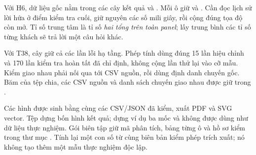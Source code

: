 Với H6, dữ liệu gốc nằm trong các cây kết quả
 và . Mỗi ô giữ
 và . Cần đọc lịch sử lời hứa
ở điểm kiểm tra cuối, giữ nguyên các số mili giây, rồi cộng đúng tọa độ
còn mở. Tỉ số trung tâm là tỉ số \emph{hai tổng trên toàn panel}; lấy trung
bình các tỉ số từng khách sẽ trả lời một câu hỏi khác.

Với T38, cây  giữ cả các lần lỗi hạ tầng. Phép
tính dùng đúng 15 lần hiệu chỉnh và 170 lần kiểm tra hoàn tất đã chỉ định,
không cộng lần thử lại vào cỡ mẫu. Kiểm giao nhau phải nối
 qua  tới
CSV nguồn, rồi dùng định danh chuyến gốc. Băm của tệp chia, các CSV nguồn
và danh sách chuyến giao nhau được giữ trong
.

Các hình được sinh bằng cùng các CSV/JSON đã kiểm, xuất PDF và SVG vector.
Tệp  dựng bốn hình kết quả;
 dựng ví dụ ba mốc và không được dùng như dữ
liệu thực nghiệm. Gói biên tập giữ mã phân tích, bảng từng ô và hồ sơ kiểm
trong thư mục . Tính lại một con số từ cùng biên bản kiểm phép
trích xuất; nó không tạo thêm một mẫu thực nghiệm độc lập.
